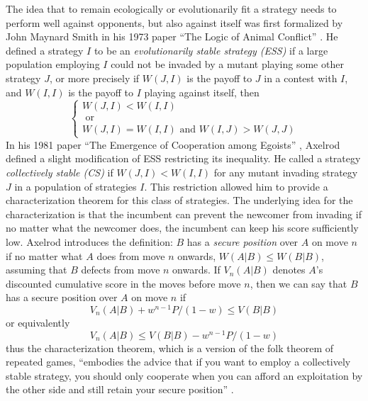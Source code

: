 The idea that to remain ecologically or evolutionarily fit a strategy needs to perform well against opponents, but also against itself was first formalized by John Maynard Smith in his 1973 paper ``The Logic of Animal Conflict'' \cite{MaynardSmith1973} . He defined a strategy $I$ to be an \textit{evolutionarily stable strategy (ESS)} if a large population employing $I$ could not be invaded by a mutant playing some other strategy $J$, or more precisely if $W(J, I)$ is the payoff to $J$ in a contest with $I$, and $W(I, I)$ is the payoff to $I$ playing against itself, then
\begin{equation} \label{eq:ESS}
\begin{cases} 
W(J, I) < W(I, I)\\
\textrm{ or}\\
W(J, I) = W(I, I) \textrm{ and } W(I, J) > W(J, J)
\end{cases}
\end{equation}
In his 1981 paper ``The Emergence of Cooperation among Egoists'' \cite{RobertAxelrod_1981}, Axelrod defined a slight modification of ESS restricting its inequality. He called a strategy \textit{collectively stable (CS)} if $W(J, I) < W(I, I)$  for any mutant invading strategy $J$ in a population of strategies $I$. This restriction allowed him to provide a characterization theorem for this class of strategies. The underlying idea for the characterization is that the incumbent can prevent the newcomer from invading if no matter what the newcomer does, the incumbent can keep his score sufficiently low. Axelrod introduces the definition: $B$ has a \textit{secure position} over $A$ on move $n$ if no matter what $A$ does from move $n$ onwards, $W(A|B) \leq W(B|B)$, assuming that $B$ defects from move $n$ onwards. If $V_n(A|B)$ denotes $A$'s discounted cumulative score in the moves before move $n$, then we can say that $B$ has a secure position over $A$ on move $n$ if 
\[
V_n(A | B) + w^{n-1} P/(1-w) \leq V(B | B) 
\]
or equivalently
\begin{equation}\label{eq:secpos}
V_n(A | B) \leq  V(B | B) - w^{n-1} P/(1-w) 
\end{equation}
thus the characterization theorem, which is a version of the folk theorem of repeated games, ``embodies the advice that if you want to employ a collectively stable strategy, you should only cooperate when you can afford an exploitation by the other side and still retain your secure position'' \cite[p.313]{RobertAxelrod_1981}.

